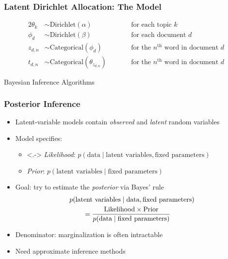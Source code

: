 \documentclass{beamer}
\newcommand{\nth}{^{\text{th}}}
\newcommand{\customSectionFrame}[1]{%
  \begin{frame}[c]{ } %
  \Large
  \color[rgb]{0,0,0.6}
  \centering %
  #1 %
  \end{frame}%
  }
\begin{document}
\begin{frame}
\frametitle{Latent Dirichlet Allocation: The Model}
\begin{alignat*}{2}
\theta_k &\sim \text{Dirichlet}(\alpha) &\qquad&\text{for each topic $k$} \\
\phi_d &\sim \text{Dirichlet}(\beta) &\qquad&\text{for each document $d$} \\
z_{d,n} &\sim \text{Categorical}(\phi_d) &\qquad&\text{for the $n\nth$ word in document $d$} \\
t_{d,n} &\sim \text{Categorical}(\theta_{z_{d,n}}) &\qquad&\text{for the $n\nth$ word in document $d$}
\end{alignat*}

\begin{center}
\end{center}
\end{frame}


\customSectionFrame{Bayesian Inference Algorithms}

\begin{frame}
\frametitle{Posterior Inference}
\begin{itemize}[<+->]
\item Latent-variable models contain \emph{observed} and \emph{latent} random variables
\item Model specifies:
    \begin{itemize}
    \item<.-> \emph{Likelihood}: $p(\text{data} \mid \text{latent variables}, \text{fixed parameters})$
    \item<+-> \emph{Prior}: $p(\text{latent variables} \mid \text{fixed parameters})$
    \end{itemize}
\item Goal: try to estimate the \emph{posterior} via Bayes' rule
\begin{align*}
\MoveEqLeft
p(\text{latent variables} \mid \text{data}, \text{fixed parameters}) \\
&=
\frac{\text{Likelihood} \times \text{Prior}}
     {p(\text{data} \mid \text{fixed parameters})}
\end{align*}
\item Denominator: marginalization is often intractable
\item Need approximate inference methods
\end{itemize}
\end{frame}
\end{document}
